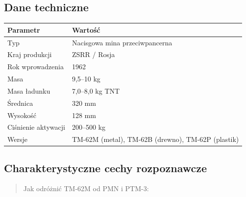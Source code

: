 \documentclass[12pt,oneside]{book}
\begin{document}
\subsection{Dane techniczne}\label{dane-techniczne-130}

\begin{longtable}[]{@{}ll@{}}
\toprule\noalign{}
Parametr & Wartość \\
\midrule\noalign{}
\endhead
\bottomrule\noalign{}
\endlastfoot
Typ & Nacisgowa mina przeciwpancerna \\
Kraj produkcji & ZSRR / Rosja \\
Rok wprowadzenia & 1962 \\
Masa & 9,5--10 kg \\
Masa ładunku & 7,0--8,0 kg TNT \\
Średnica & 320 mm \\
Wysokość & 128 mm \\
Ciśnienie aktywacji & 200--500 kg \\
Wersje & TM-62M (metal), TM-62B (drewno), TM-62P (plastik) \\
\end{longtable}

\subsection{Charakterystyczne cechy
rozpoznawcze}\label{charakterystyczne-cechy-rozpoznawcze-130}

\begin{quote}
Jak odróżnić TM-62M od PMN i PTM-3:
\end{quote}
\end{document}

